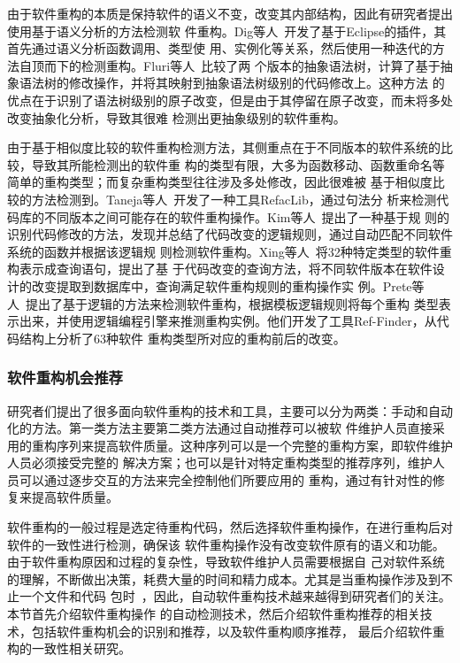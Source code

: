 由于软件重构的本质是保持软件的语义不变，改变其内部结构，因此有研究者提出使用基于语义分析的方法检测软
件重构。Dig等人~\cite{dig2006automated}开发了基于Eclipse的插件，其首先通过语义分析函数调用、类型使
用、实例化等关系，然后使用一种迭代的方法自顶而下的检测重构。Fluri等人~\cite{fluri2007change}比较了两
个版本的抽象语法树，计算了基于抽象语法树的修改操作，并将其映射到抽象语法树级别的代码修改上。这种方法
的优点在于识别了语法树级别的原子改变，但是由于其停留在原子改变，而未将多处改变抽象化分析，导致其很难
检测出更抽象级别的软件重构。

由于基于相似度比较的软件重构检测方法，其侧重点在于不同版本的软件系统的比较，导致其所能检测出的软件重
构的类型有限，大多为函数移动、函数重命名等简单的重构类型；而复杂重构类型往往涉及多处修改，因此很难被
基于相似度比较的方法检测到。Taneja等人~\cite{taneja2007automated}开发了一种工具RefacLib，通过句法分
析来检测代码库的不同版本之间可能存在的软件重构操作。Kim等人~\cite{kim2007automatic}提出了一种基于规
则的识别代码修改的方法，发现并总结了代码改变的逻辑规则，通过自动匹配不同软件系统的函数并根据该逻辑规
则检测软件重构。Xing等人~\cite{xing2006refactoring}将32种特定类型的软件重构表示成查询语句，提出了基
于代码改变的查询方法，将不同软件版本在软件设计的改变提取到数据库中，查询满足软件重构规则的重构操作实
例。Prete等人~\cite{prete2010template}提出了基于逻辑的方法来检测软件重构，根据模板逻辑规则将每个重构
类型表示出来，并使用逻辑编程引擎来推测重构实例。他们开发了工具Ref-Finder，从代码结构上分析了63种软件
重构类型所对应的重构前后的改变。

\subsubsection{软件重构机会推荐}


研究者们提出了很多面向软件重构的技术和工具，主要可以分为两类：手动和自动化的方法。第一类方法主要第二类方法通过自动推荐可以被软
件维护人员直接采用的重构序列来提高软件质量\cite{harman2007pareto, kessentini2011design,
ouni2013maintainability, Silva2014}。这种序列可以是一个完整的重构方案，即软件维护人员必须接受完整的
解决方案；也可以是针对特定重构类型的推荐序列，维护人员可以通过逐步交互的方法来完全控制他们所要应用的
重构，通过有针对性的修复来提高软件质量。

软件重构的一般过程是选定待重构代码，然后选择软件重构操作，在进行重构后对软件的一致性进行检测，确保该
软件重构操作没有改变软件原有的语义和功能。由于软件重构原因和过程的复杂性，导致软件维护人员需要根据自
己对软件系统的理解，不断做出决策，耗费大量的时间和精力成本。尤其是当重构操作涉及到不止一个文件和代码
包时~\cite{liu2013monitor}，因此，自动软件重构技术越来越得到研究者们的关注。本节首先介绍软件重构操作
的自动检测技术，然后介绍软件重构推荐的相关技术，包括软件重构机会的识别和推荐，以及软件重构顺序推荐，
最后介绍软件重构的一致性相关研究。


